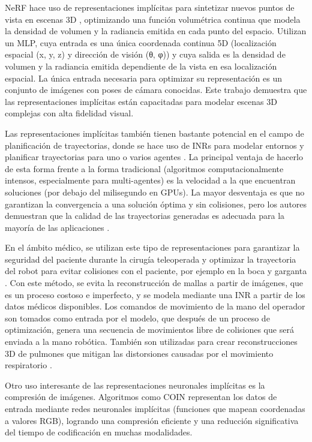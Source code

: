 NeRF hace uso de representaciones implícitas para sintetizar nuevos puntos de vista en escenas 3D \cite{mildenhall2020nerfrepresentingscenesneural},
optimizando una función volumétrica continua que modela la densidad de volumen y la radiancia emitida en cada punto del espacio.
Utilizan un MLP, cuya entrada es una única coordenada continua 5D (localización espacial (x, y, z) y dirección de visión (θ, φ))
y cuya salida es la densidad de volumen y la radiancia emitida dependiente de la vista en esa localización espacial.
La única entrada necesaria para optimizar su representación es un conjunto de imágenes con poses de cámara conocidas.
Este trabajo demuestra que las representaciones implícitas están capacitadas para modelar escenas 3D complejas con alta fidelidad visual.

Las representaciones implícitas también tienen bastante potencial en el campo de planificación de trayectorias,
donde se hace uso de INRs para modelar entornos y planificar trayectorias para uno o varios agentes \cite{yu2024neuraltrajectorymodelimplicit}.
La principal ventaja de hacerlo de esta forma frente a la forma tradicional (algoritmos computacionalmente intensos, especialmente para multi-agentes) es la velocidad a la que encuentran soluciones (por debajo del milisegundo en GPUs).
La mayor desventaja es que no garantizan la convergencia a una solución óptima y sin colisiones, pero los autores demuestran que la calidad de las trayectorias generadas es adecuada para la mayoría de las aplicaciones \cite{trajectinr}.

En el ámbito médico, se utilizan este tipo de representaciones para garantizar la seguridad del paciente durante la cirugía teleoperada y optimizar la trayectoria del robot para evitar colisiones con el paciente, por ejemplo en la boca y garganta \cite{teleoperatdrob}.
Con este método, se evita la reconstrucción de mallas a partir de imágenes, que es un proceso costoso e imperfecto, y se modela mediante una INR a partir de los datos médicos disponibles.
Los comandos de movimiento de la mano del operador son tomados como entrada por el modelo, que después de un proceso de optimización, genera una secuencia de movimientos libre de colisiones que será enviada a la mano robótica.
También son utilizadas para crear reconstrucciones 3D de pulmones que mitigan las distorsiones causadas por el movimiento respiratorio \cite{velikova2024implicitneuralrepresentationsbreathingcompensated}.

Otro uso interesante de las representaciones neuronales implícitas es la compresión de imágenes. Algoritmos como COIN \cite{coin} representan los datos de entrada mediante redes neuronales implícitas (funciones que mapean coordenadas a valores RGB), logrando una compresión eficiente y una reducción significativa del tiempo de codificación en muchas modalidades.

